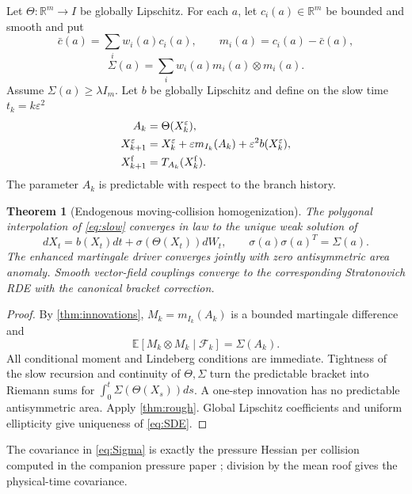 \documentclass[11pt,reqno]{amsart}
\newtheorem{theorem}{Theorem}[section]
\theoremstyle{definition}
\theoremstyle{remark}
\newcommand{\E}{\mathbb E}
\newcommand{\R}{\mathbb R}
\newcommand{\F}{\mathcal F}
\begin{document}
Let $\Theta:\R^m\to I$ be globally Lipschitz.  For each $a$, let
$c_i(a)\in\R^m$ be bounded and smooth and put
\[
 \bar c(a)=\sum_iw_i(a)c_i(a),
 \qquad m_i(a)=c_i(a)-\bar c(a),
\]
\begin{equation}\label{eq:Sigma}
 \Sigma(a)=\sum_iw_i(a)m_i(a)\otimes m_i(a).
\end{equation}
Assume $\Sigma(a)\ge\lambda I_m$.  Let $b$ be globally Lipschitz and define
on the slow time $t_k=k\varepsilon^2$
\begin{align}
 A_k&=\Theta(X_k^\varepsilon),\label{eq:Ak}\\
 X_{k+1}^\varepsilon&=X_k^\varepsilon
 +\varepsilon m_{I_k}(A_k)+\varepsilon^2b(X_k^\varepsilon),
 \label{eq:slow}\\
 X_{k+1}^{\rm f}&=T_{A_k}(X_k^{\rm f}).
\end{align}
The parameter $A_k$ is predictable with respect to the branch history.

\begin{theorem}[Endogenous moving-collision homogenization]\label{thm:homogenization}
The polygonal interpolation of \eqref{eq:slow} converges in law to the unique
weak solution of
\begin{equation}\label{eq:SDE}
 dX_t=b(X_t)dt+\sigma(\Theta(X_t))dW_t,
 \qquad \sigma(a)\sigma(a)^T=\Sigma(a).
\end{equation}
The enhanced martingale driver converges jointly with zero antisymmetric area
anomaly.  Smooth vector-field couplings converge to the corresponding
Stratonovich RDE with the canonical bracket correction.
\end{theorem}

\begin{proof}
By \cref{thm:innovations},
$M_k=m_{I_k}(A_k)$ is a bounded martingale difference and
\[
 \E[M_k\otimes M_k\mid\F_k]=\Sigma(A_k).
\]
All conditional moment and Lindeberg conditions are immediate.  Tightness of
the slow recursion and continuity of $\Theta,\Sigma$ turn the predictable
bracket into Riemann sums for
$\int_0^t\Sigma(\Theta(X_s))ds$.  A one-step innovation has no predictable
antisymmetric area.  Apply \cref{thm:rough}.  Global Lipschitz coefficients and
uniform ellipticity give uniqueness of \eqref{eq:SDE}.
\end{proof}

The covariance in \eqref{eq:Sigma} is exactly the pressure Hessian per collision
computed in the companion pressure paper \cite{QiPressureRound4}; division by
the mean roof gives the physical-time covariance.
\end{document}
